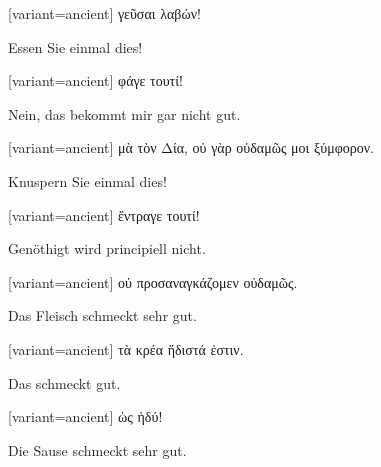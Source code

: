 \switchcolumn

\begin{greek}[variant=ancient]%
γεῦσαι λαβών!

\end{greek}%
\switchcolumn*

Essen Sie einmal dies!

\switchcolumn

\begin{greek}[variant=ancient]%
φάγε τουτί!

\end{greek}%
\switchcolumn*

Nein, das bekommt mir gar nicht gut.

\switchcolumn

\begin{greek}[variant=ancient]%
μὰ τὸν Δία, οὐ γὰρ οὐδαμῶς μοι ξύμφορον.

\end{greek}%
\switchcolumn*

Knus\textcompwordmark{}pern Sie einmal dies!

\switchcolumn

\begin{greek}[variant=ancient]%
ἔντραγε τουτί!

\end{greek}%
\switchcolumn*

Genöthigt wird principiell nicht.

\switchcolumn

\begin{greek}[variant=ancient]%
οὐ προσαναγκάζομεν οὐδαμῶς.

\end{greek}%
\switchcolumn*

Das Fleisch schmeckt sehr gut.

\switchcolumn

\begin{greek}[variant=ancient]%
τὰ κρέα ἥδιστά ἐστιν.

\end{greek}%
\switchcolumn*

Das schmeckt gut.

\switchcolumn

\begin{greek}[variant=ancient]%
ὡς ἡδύ!

\end{greek}%
\switchcolumn*

Die Sause schmeckt sehr gut.

\switchcolumn

